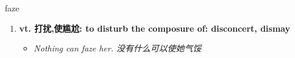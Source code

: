 
\begin{frame}
{\huge faze}
\begin{center}
\begin{enumerate}\Large
  \item \textbf{vt. 打扰,使尴尬: to disturb the composure of: disconcert, dismay}
  \begin{itemize}
    \item \em{\Large{Nothing can faze her. 没有什么可以使她气馁}}
  \end{itemize}
\end{enumerate}
\end{center}
\end{frame}
